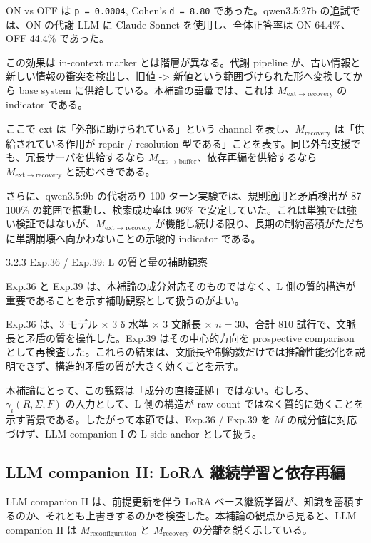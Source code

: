 \documentclass[12pt,a4paper]{article}
\begin{document}
ON vs OFF は \texttt{p\ =\ 0.0004}, Cohen's \texttt{d\ =\ 8.80} であった。qwen3.5:27b の追試では、ON の代謝 LLM に Claude Sonnet を使用し、全体正答率は ON 64.4\%、OFF 44.4\% であった。

この効果は in-context marker とは階層が異なる。代謝 pipeline が、古い情報と新しい情報の衝突を検出し、旧値 -\textgreater{} 新値という範囲づけられた形へ変換してから base system に供給している。本補論の語彙では、これは \(M_{\mathrm{ext}\to\mathrm{recovery}}\) の indicator である。

ここで \(\mathrm{ext}\) は「外部に助けられている」という channel を表し、\(M_{\mathrm{recovery}}\) は「供給されている作用が repair / resolution 型である」ことを表す。同じ外部支援でも、冗長サーバを供給するなら \(M_{\mathrm{ext}\to\mathrm{buffer}}\)、依存再編を供給するなら \(M_{\mathrm{ext}\to\mathrm{recovery}}\) と読むべきである。

さらに、qwen3.5:9b の代謝あり 100 ターン実験では、規則適用と矛盾検出が 87-100\% の範囲で振動し、検索成功率は 96\% で安定していた。これは単独では強い検証ではないが、\(M_{\mathrm{ext}\to\mathrm{recovery}}\) が機能し続ける限り、長期の制約蓄積がただちに単調崩壊へ向かわないことの示唆的 indicator である。

3.2.3 Exp.36 / Exp.39: L の質と量の補助観察

Exp.36 と Exp.39 は、本補論の成分対応そのものではなく、L 側の質的構造が重要であることを示す補助観察として扱うのがよい。

Exp.36 は、3 モデル × 3 δ 水準 × 3 文脈長 × \(n=30\)、合計 810 試行で、文脈長と矛盾の質を操作した。Exp.39 はその中心的方向を prospective comparison として再検査した。これらの結果は、文脈長や制約数だけでは推論性能劣化を説明できず、構造的矛盾の質が大きく効くことを示す。

本補論にとって、この観察は「成分の直接証拠」ではない。むしろ、\(\gamma_i(R,\Sigma,F)\) の入力として、L 側の構造が raw count ではなく質的に効くことを示す背景である。したがって本節では、Exp.36 / Exp.39 を \(M\) の成分値に対応づけず、LLM companion I の L-side anchor として扱う。

\subsection{LLM companion II: LoRA 継続学習と依存再編}\label{llm-companion-ii-lora-ux7d99ux7d9aux5b66ux7fd2ux3068ux4f9dux5b58ux518dux7de8}

LLM companion II は、前提更新を伴う LoRA ベース継続学習が、知識を蓄積するのか、それとも上書きするのかを検査した。本補論の観点から見ると、LLM companion II は \(M_{\mathrm{reconfiguration}}\) と \(M_{\mathrm{recovery}}\) の分離を鋭く示している。
\end{document}
